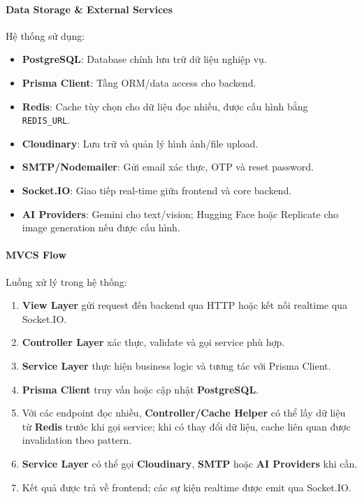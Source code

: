 \paragraph{Data Storage \& External Services} Hệ thống sử dụng:
\begin{itemize}
    \item \textbf{PostgreSQL}: Database chính lưu trữ dữ liệu nghiệp vụ.
    \item \textbf{Prisma Client}: Tầng ORM/data access cho backend.
    \item \textbf{Redis}: Cache tùy chọn cho dữ liệu đọc nhiều, được cấu hình bằng \texttt{REDIS\_URL}.
    \item \textbf{Cloudinary}: Lưu trữ và quản lý hình ảnh/file upload.
    \item \textbf{SMTP/Nodemailer}: Gửi email xác thực, OTP và reset password.
    \item \textbf{Socket.IO}: Giao tiếp real-time giữa frontend và core backend.
    \item \textbf{AI Providers}: Gemini cho text/vision; Hugging Face hoặc Replicate cho image generation nếu được cấu hình.
\end{itemize}

\paragraph{MVCS Flow} Luồng xử lý trong hệ thống:
\begin{enumerate}
    \item \textbf{View Layer} gửi request đến backend qua HTTP hoặc kết nối realtime qua Socket.IO.
    \item \textbf{Controller Layer} xác thực, validate và gọi service phù hợp.
    \item \textbf{Service Layer} thực hiện business logic và tương tác với Prisma Client.
    \item \textbf{Prisma Client} truy vấn hoặc cập nhật \textbf{PostgreSQL}.
    \item Với các endpoint đọc nhiều, \textbf{Controller/Cache Helper} có thể lấy dữ liệu từ \textbf{Redis} trước khi gọi service; khi có thay đổi dữ liệu, cache liên quan được invalidation theo pattern.
    \item \textbf{Service Layer} có thể gọi \textbf{Cloudinary}, \textbf{SMTP} hoặc \textbf{AI Providers} khi cần.
    \item Kết quả được trả về frontend; các sự kiện realtime được emit qua Socket.IO.
\end{enumerate}

